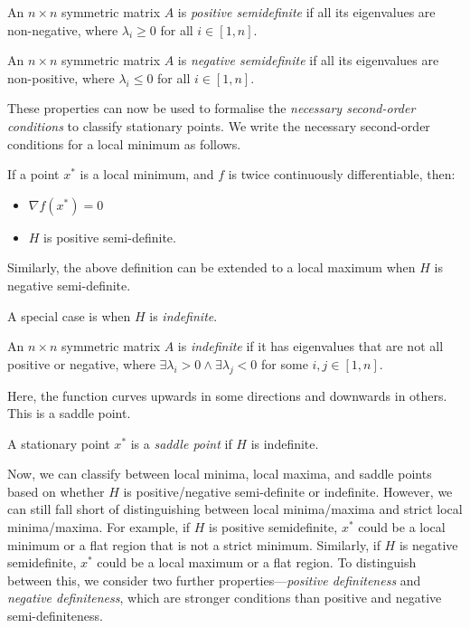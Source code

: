 \begin{definition}
    An $n \times n$ symmetric matrix $A$ is \textit{positive semidefinite} if all its eigenvalues are non-negative, where $\lambda_i \geq 0$ for all $i \in [1, n]$.
\end{definition}
\begin{definition}
    An $n \times n$ symmetric matrix $A$ is \textit{negative semidefinite} if all its eigenvalues are non-positive, where $\lambda_i \leq 0$ for all $i \in [1, n]$.
\end{definition}

These properties can now be used to formalise the \textit{necessary second-order conditions} to classify stationary points. We write the necessary second-order conditions for a local minimum as follows.
\begin{definition}
    If a point $x^*$ is a local minimum, and $f$ is twice continuously differentiable, then:
    \begin{itemize}
        \item $\nabla f(x^*) = 0$
        \item $H$ is positive semi-definite.
    \end{itemize}
\end{definition}
Similarly, the above definition can be extended to a local maximum when $H$ is negative semi-definite.

A special case is when $H$ is \textit{indefinite}.
\begin{definition}
    An $n \times n$ symmetric matrix $A$ is \textit{indefinite} if it has eigenvalues that are not all positive or negative, where $\exists \lambda_i > 0 \wedge \exists \lambda_j < 0$ for some $i, j \in [1, n]$.
\end{definition}
Here, the function curves upwards in some directions and downwards in others. This is a saddle point.

\begin{definition}
    A stationary point $x^*$ is a \textit{saddle point} if $H$ is indefinite.
\end{definition}

Now, we can classify between local minima, local maxima, and saddle points based on whether $H$ is positive/negative semi-definite or indefinite. However, we can still fall short of distinguishing between local minima/maxima and strict local minima/maxima. For example, if $H$ is positive semidefinite, $x^*$ could be a local minimum or a flat region that is not a strict minimum. Similarly, if $H$ is negative semidefinite, $x^*$ could be a local maximum or a flat region. To distinguish between this, we consider two further properties---\textit{positive definiteness} and \textit{negative definiteness}, which are stronger conditions than positive and negative semi-definiteness.


